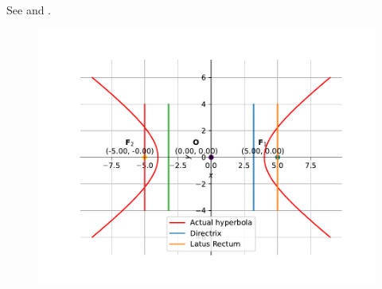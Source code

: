 See 
and
.
\begin{figure}[H]
	\begin{center}
		\includegraphics[width=0.75\columnwidth]{chapters/11/11/4/1/figs/fig.pdf}
	\end{center}
\caption{}
\label{fig:11/11/4/1Fig1}
\end{figure}
